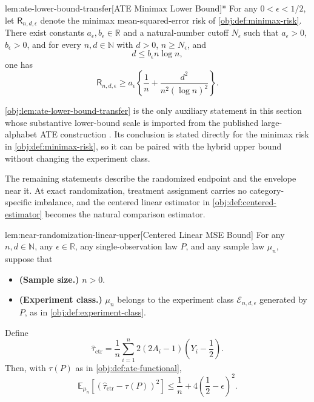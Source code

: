 \begin{lemmav}{lem:ate-lower-bound-transfer}[ATE Minimax Lower Bound]*
For any \(0<\epsilon<1/2\), let \(\mathsf R_{n,d,\epsilon}\) denote the minimax mean-squared-error risk of \cref{obj:def:minimax-risk}. There exist constants \(a_\epsilon,b_\epsilon\in\mathbb R\) and a natural-number cutoff \(N_\epsilon\) such that \(a_\epsilon>0\), \(b_\epsilon>0\), and for every \(n,d\in\mathbb N\) with \(d>0\), \(n\ge N_\epsilon\), and
\[
d\le b_\epsilon n\log n,
\]
one has
\[
\mathsf R_{n,d,\epsilon}
\ge
a_\epsilon\left\{\frac{1}{n}+\frac{d^2}{n^2(\log n)^2}\right\}.
\]
\end{lemmav}
\cref{obj:lem:ate-lower-bound-transfer} is the only auxiliary statement in this section whose substantive lower-bound scale is imported from the published large-alphabet ATE construction \citep{ZengBalakrishnanHanKennedy2024}. Its conclusion is stated directly for the minimax risk in \cref{obj:def:minimax-risk}, so it can be paired with the hybrid upper bound without changing the experiment class.

The remaining statements describe the randomized endpoint and the envelope near it. At exact randomization, treatment assignment carries no category-specific imbalance, and the centered linear estimator in \cref{obj:def:centered-estimator} becomes the natural comparison estimator.

\begin{lemmav}{lem:near-randomization-linear-upper}[Centered Linear MSE Bound]
For any \(n,d\in\mathbb N\), any \(\epsilon\in\mathbb R\), any single-observation law \(P\), and any sample law \(\mu_n\), suppose that
\begin{itemize}
\item \textbf{(Sample size.)} \(n>0\).
\item \textbf{(Experiment class.)} \(\mu_n\) belongs to the experiment class \(\mathcal E_{n,d,\epsilon}\) generated by \(P\), as in \cref{obj:def:experiment-class}.
\end{itemize}
Define
\[
\widehat\tau_{\mathrm{ctr}}
=
\frac1n\sum_{i=1}^n
2(2A_i-1)\left(Y_i-\frac12\right).
\]
Then, with \(\tau(P)\) as in \cref{obj:def:ate-functional},
\[
\mathbb E_{\mu_n}\left[\left(\widehat\tau_{\mathrm{ctr}}-\tau(P)\right)^2\right]
\le
\frac1n+4\left(\frac12-\epsilon\right)^2.
\]
\end{lemmav}

